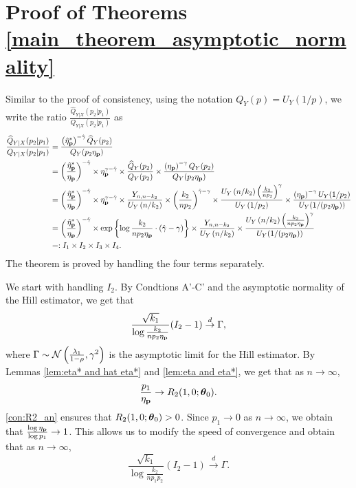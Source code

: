 \section{Proof of Theorems \ref{main_theorem_asymptotic_normality} } \label{appen_proofB}

    Similar to the proof of consistency, using the notation $Q_Y(p)=U_Y(1/p)$, we  write the ratio $\frac{\widehat{Q}_{Y|X}(p_2|p_1)}{Q_{Y|X}(p_2|p_1)}$ as 
    \begin{align*}
        \frac{\widehat{Q}_{Y|X}(p_2|p_1)}{Q_{Y|X}(p_2|p_1)} &=\frac{\left(\hat{\eta}_{\mathbf p}^*\right)^{-\hat\gamma}\widehat{Q}_Y(p_2)}{Q_Y(p_2\eta_{\mathbf p})}\\
        &=\left(\frac{\hat{\eta}_{\mathbf p}^*}{\eta_{\mathbf p}}\right)^{-\hat\gamma}\times \eta_{\mathbf p}^{\gamma-\hat\gamma
        } \times \frac{\widehat{Q}_Y(p_2)}{Q_Y(p_2)} \times\frac{\left(\eta_{\mathbf p}\right)^{-\gamma}Q_Y(p_2)}{Q_Y(p_2\eta_{\mathbf p})} \\
        &=\left(\frac{\hat{\eta}_{\mathbf p}^*}{\eta_{\mathbf p}}\right)^{-\hat\gamma}\times \eta_{\mathbf p}^{\gamma-\hat\gamma
        } \times \frac{Y_{n,n-k_2}}{U_Y\left(n/k_2\right)}\times \left(\frac{k_2}{np_2}\right)^{\hat\gamma -\gamma}\times \frac{U_Y\left(n/k_2\right)\left(\frac{k_2}{np_2}\right)^\gamma}{U_Y\left(1/p_2\right)} \times\frac{\left(\eta_{\mathbf p}\right)^{-\gamma}U_Y(1/p_2)}{U_Y(1/(p_2\eta_{\mathbf p}))} \\
        &=\left(\frac{\hat{\eta}_{\mathbf p}^*}{\eta_{\mathbf p}}\right)^{-\hat\gamma}\times \exp\left\{\log \frac{k_2}{np_2\eta_{\mathbf p}}\cdot\left(\hat\gamma-\gamma\right)\right\} \times \frac{Y_{n,n-k_2}}{U_Y\left(n/k_2\right)}\times \frac{U_Y\left(n/k_2\right)\left(\frac{k_2}{np_2\eta_{\mathbf p}}\right)^\gamma}{U_Y(1/(p_2\eta_{\mathbf p}))} \\
        &=:I_1\times I_2\times I_3\times I_4.
    \end{align*}
    The theorem is proved by handling the four terms separately.

    We start with handling $I_2$. By Condtions A'-C' and the asymptotic normality of the Hill estimator, we get that
    $$\frac{\sqrt{k_1}}{\log \frac{k_2}{np_2\eta_{\mathbf p}}}(I_2-1)\stackrel{d}{\to}\Gamma,$$
    where $\Gamma\sim {\cal N}\left(\frac{\lambda_1}{1-\rho},\gamma^2\right)$ is the asymptotic limit for the Hill estimator.
    By Lemmas \ref{lem:eta* and hat eta*} and \ref{lem:eta and eta*}, we get that as $n\to\infty$,
    $$\frac{p_1}{\eta_{\mathbf p}}\to R_2(1,0;\boldsymbol{\theta}_0).$$
    \ref{con:R2_an} ensures that $R_2(1,0;\boldsymbol{\theta}_0)>0$. Since $p_1\to0$ as $n\to\infty$, we obtain that $\frac{\log \eta_{\mathbf p}}{\log p_1}\to 1$. This allows us to modify the speed of convergence and obtain that as $n\to\infty$,
$$\frac{\sqrt{k_1}}{\log \frac{k_2}{np_1p_2}}(I_2-1)\stackrel{d}{\to}\Gamma.$$

